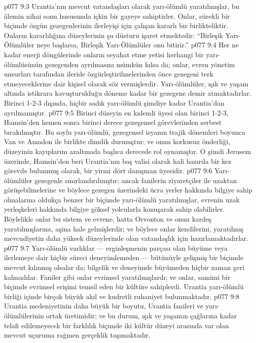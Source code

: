 \vs p077 9:3 Urantia’nın mevcut vatandaşları olarak yarı\hyp{}ölümlü yaratılmışlar, bu âlemin nihai sonu hususunda içkin bir gayeye sahiptirler. Onlar, sürekli bir biçimde özgün gezegenlerinin ilerleyişi için çalışan kararlı bir birlikteliktir. Onların kararlılığına düzeylerinin şu düsturu işaret etmektedir: “Birleşik Yarı\hyp{}Ölümlüler neye başlarsa, Birleşik Yarı\hyp{}Ölümlüler onu bitirir.”
\vs p077 9:4 Her ne kadar enerji döngülerinde onların seyahat etme yetisi herhangi bir yarı\hyp{}ölümlüsünün gezegenden ayrılmasını mümkün kılsa da; onlar, evren yönetim unsurları tarafından ileride özgürleştirilmelerinden önce gezegeni terk etmeyeceklerine dair kişisel olarak söz vermişlerdir. Yarı\hyp{}ölümlüler, ışık ve yaşam altında istikrara kavuşturulduğu döneme kadar bir gezegene demir atmaktadırlar. Birinci 1\hyp{}2\hyp{}3 dışında, hiçbir sadık yarı\hyp{}ölümlü şimdiye kadar Urantia’dan ayrılmamıştır.
\vs p077 9:5 Birinci düzeyin en kıdemli üyesi olan birinci 1\hyp{}2\hyp{}3, Hamsin’den hemen sonra birinci derece gezegensel görevlerinden serbest bırakılmıştır. Bu soylu yarı\hyp{}ölümlü, gezegensel isyanın trajik dönemleri boyunca Van ve Amadon ile birlikte dimdik durmuştur; ve onun korkusuz önderliği, düzeyinin kayıplarını azaltmada başlıca derecede rol oynamıştır. O şimdi Jerusem üzerinde, Hamsin’den beri Urantia’nın baş valisi olarak hali hazırda bir kez görevde bulunmuş olarak, bir yirmi dört danışman üyesidir.
\vs p077 9:6 Yarı\hyp{}ölümlüler gezegenle sınırlandırılmıştır; ancak fanilerin ziyaretçiler ile uzaktan görüşebilmelerine ve böylece gezegen üzerindeki ücra yerler hakkında bilgiye sahip olmalarına oldukça benzer bir biçimde yarı\hyp{}ölümlü yaratılmışlar, evrenin uzak yerleşkeleri hakkında bilgiye göksel yolcularla konuşarak sahip olabilirler. Böylelikle onlar bu sistem ve evrene, hatta Orvonton ve onun kardeş yaratılmışlarına, aşina hale gelmişlerdir; ve böylece onlar kendilerini, yaratılmış mevcudiyetin daha yüksek düzeylerinde olan vatandaşlık için hazırlamaktadırlar.
\vs p077 9:7 Yarı\hyp{}ölümlü varlıklar --- erginleşmenin parçası olan büyüme veya ilerlemeye dair hiçbir süreci deneyimlemeden --- bütünüyle gelişmiş bir biçimde mevcut kılınmış olsalar da; bilgelik ve deneyimde büyümeden hiçbir zaman geri kalmadılar. Faniler gibi onlar evrimsel yaratılmışlardı; ve onlar, samimi bir biçimde evrimsel erişimi temsil eden bir kültüre sahiplerdi. Urantia yarı\hyp{}ölümlü birliği içinde birçok büyük akıl ve kudretli ruhaniyet bulunmaktadır.
\vs p077 9:8 Urantia medeniyetinin daha büyük bir boyutu, Urantia fanileri ve yarı\hyp{}ölümlülerinin ortak üretimidir; ve bu durum, ışık ve yaşamın çağlarına kadar telafi edilemeyecek bir farklılık biçimde iki kültür düzeyi arasında var olan mevcut uçuruma rağmen gerçeklik taşımaktadır.
